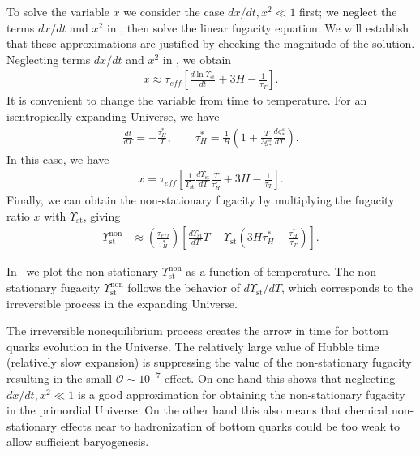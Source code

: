 To solve the variable $x$ we consider the case $dx/dt,x^2\ll1$ first; we neglect the terms $dx/dt$ and $x^2$ in , then solve the linear fugacity equation. We will establish that these approximations are justified by checking the magnitude of the solution. Neglecting terms $dx/dt$ and $x^2$ in , we obtain
\begin{align}
x\approx\tau_{eff}\left[\frac{d\ln\Upsilon_\mathrm{st}}{dt}+3H-\frac{1}{\tau_T}\right].
\end{align}
It is convenient to change the variable from time to temperature. For an isentropically-expanding Universe, we have
\begin{align}\label{tau_H}
\frac{dt}{dT}=-\frac{\tau^\ast_H}{T},\qquad \tau^\ast_H=\frac{1}{H}\left(1+\frac{T}{3g^s_\ast}\frac{dg^s_\ast}{dT}\right).
\end{align}
In this case, we have
\begin{align}
x=\tau_{eff}\left[\frac{1}{\Upsilon_\mathrm{st}}\frac{d\Upsilon_\mathrm{st}}{dT}\frac{T}{\tau^\ast_H}+3H-\frac{1}{\tau_T}\right].
\end{align}
Finally, we can obtain the non-stationary fugacity by multiplying the fugacity ratio $x$ with $\Upsilon_\mathrm{st}$, giving 
\begin{align}
\Upsilon_{\mathrm{st}}^{\mathrm{non}}
&\approx\left(\frac{\tau_{eff}}{\tau^\ast_H}\right)\left[\frac{d\Upsilon_\mathrm{st}}{dT}T-\Upsilon_{\mathrm{st}}\left(3H\tau^\ast_H-\frac{\tau^\ast_H}{\tau_T}\right)\right].
\end{align}

In~ we plot the non stationary $\Upsilon^{\mathrm{non}}_\mathrm{st}$ as a function of temperature. The non stationary fugacity $\Upsilon^{\mathrm{non}}_\mathrm{st}$ follows the behavior of $d\Upsilon_{\mathrm{st}}/dT$, which corresponds to the irreversible process in the expanding Universe. 

The irreversible nonequilibrium process creates the arrow in time for bottom quarks evolution in the Universe. The relatively large value of Hubble time (relatively slow expansion) is suppressing the value of the non-stationary fugacity resulting in the small $\mathcal{O}\sim10^{-7}$ effect. On one hand this shows that  neglecting $dx/dt,x^2\ll1$ is a good approximation for obtaining the non-stationary fugacity in the primordial Universe. On the other hand this also means that chemical non-stationary effects near to hadronization of bottom quarks could be too weak to allow sufficient baryogenesis.


